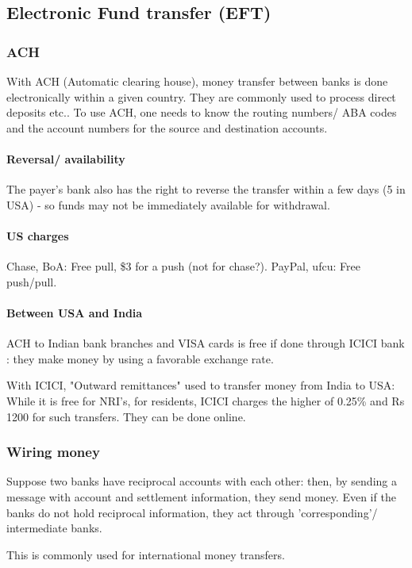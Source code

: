 \documentclass[oneside, article]{memoir}
\begin{document}
\subsection{Electronic Fund transfer (EFT)}
\subsubsection{ACH}
With ACH (Automatic clearing house), money transfer between banks is done electronically within a given country. They are commonly used to process direct deposits etc.. To use ACH, one needs to know the routing numbers/ ABA codes and the account numbers for the source and destination accounts.

\paragraph{Reversal/ availability}
The payer's bank also has the right to reverse the transfer within a few days (5 in USA) - so funds may not be immediately available for withdrawal.

\paragraph{US charges}
Chase, BoA: Free pull, \$3 for a push (not for chase?). PayPal, ufcu: Free push/pull.

\paragraph{Between USA and India}
ACH to Indian bank branches and VISA cards is free if done through ICICI bank : they make money by using a favorable exchange rate.

With ICICI, "Outward remittances" used to transfer money from India to USA: While it is free for NRI's, for residents, ICICI charges the higher of 0.25\% and Rs 1200 for such transfers. They can be done online.

\subsubsection{Wiring money}
Suppose two banks have reciprocal accounts with each other: then, by sending a message with account and settlement information, they send money. Even if the banks do not hold reciprocal information, they act through 'corresponding'/ intermediate banks.

This is commonly used for international money transfers.
\end{document}

